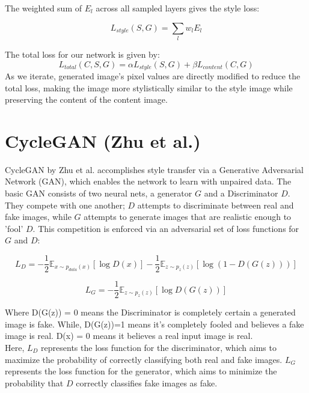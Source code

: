 \documentclass[12pt]{article}
\begin{document}
The weighted sum of \(E_l\) across all sampled layers gives the style loss:

\begin{equation}
    L_{style}(S, G) = \sum_{l} w_l E_l
\end{equation}

The total loss for our network is given by:
\begin{equation}
L_{total}(C,S,G) = \alpha L_{style}(S, G) + \beta L_{content}(C, G)
\end{equation}
As we iterate, generated image's pixel values are directly modified to reduce the total loss, making the image more stylistically similar to the style image while preserving the content of the content image. 

\section{CycleGAN (Zhu et al.)}

CycleGAN by Zhu et al. accomplishes style transfer via a Generative Adversarial Network (GAN), which enables the network to learn with unpaired data. The basic GAN consists of two neural nets, a generator \(G\) and a Discriminator \(D\). They compete with one another; \(D\) attempts to discriminate between real and fake images, while \(G\) attempts to generate images that are realistic enough to 'fool' \(D\). This competition is enforced via an adversarial set of loss functions for \(G\) and \(D\):

\begin{equation}
L_D = -\frac{1}{2}\mathbb{E}_{x\sim p_{data}(x)}[\log D(x)] - \frac{1}{2}\mathbb{E}_{z\sim p_z(z)}[\log(1 - D(G(z)))]
\end{equation}

\begin{equation}
L_G = -\frac{1}{2}\mathbb{E}_{z\sim p_z(z)}[\log D(G(z))]
\end{equation}

Where D(G(z)) = 0 means the Discriminator is completely certain a generated image is fake. While, D(G(z))=1 means it's completely fooled and believes a fake image is real. D(x) = 0 means it believes a real input image is real. \\

Here, \(L_D\) represents the loss function for the discriminator, which aims to maximize the probability of correctly classifying both real and fake images. \(L_G\) represents the loss function for the generator, which aims to minimize the probability that \(D\) correctly classifies fake images as fake.
\end{document}
